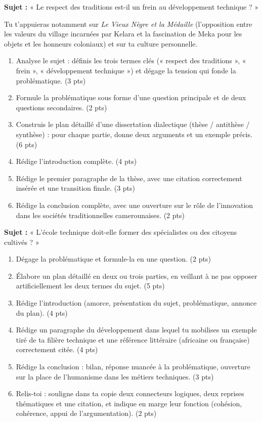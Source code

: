 \documentclass[11pt]{article}
\begin{document}
\begin{exercice}
\textbf{Sujet :} « Le respect des traditions est-il un frein au développement technique ? »

Tu t'appuieras notamment sur \emph{Le Vieux Nègre et la Médaille} (l'opposition entre les valeurs du village incarnées par Kelara et la fascination de Meka pour les objets et les honneurs coloniaux) et sur ta culture personnelle.
\begin{enumerate}
\item Analyse le sujet : définis les trois termes clés (« respect des traditions », « frein », « développement technique ») et dégage la tension qui fonde la problématique. (3 pts)
\item Formule la problématique sous forme d'une question principale et de deux questions secondaires. (2 pts)
\item Construis le plan détaillé d'une dissertation dialectique (thèse / antithèse / synthèse) : pour chaque partie, donne deux arguments et un exemple précis. (6 pts)
\item Rédige l'introduction complète. (4 pts)
\item Rédige le premier paragraphe de la thèse, avec une citation correctement insérée et une transition finale. (3 pts)
\item Rédige la conclusion complète, avec une ouverture sur le rôle de l'innovation dans les sociétés traditionnelles camerounaises. (2 pts)
\end{enumerate}
\end{exercice}

\begin{exercice}
\textbf{Sujet :} « L'école technique doit-elle former des spécialistes ou des citoyens cultivés ? »
\begin{enumerate}
\item Dégage la problématique et formule-la en une question. (2 pts)
\item Élabore un plan détaillé en deux ou trois parties, en veillant à ne pas opposer artificiellement les deux termes du sujet. (5 pts)
\item Rédige l'introduction (amorce, présentation du sujet, problématique, annonce du plan). (4 pts)
\item Rédige un paragraphe du développement dans lequel tu mobilises un exemple tiré de ta filière technique et une référence littéraire (africaine ou française) correctement citée. (4 pts)
\item Rédige la conclusion : bilan, réponse nuancée à la problématique, ouverture sur la place de l'humanisme dans les métiers techniques. (3 pts)
\item Relis-toi : souligne dans ta copie deux connecteurs logiques, deux reprises thématiques et une citation, et indique en marge leur fonction (cohésion, cohérence, appui de l'argumentation). (2 pts)
\end{enumerate}
\end{exercice}
\end{document}
